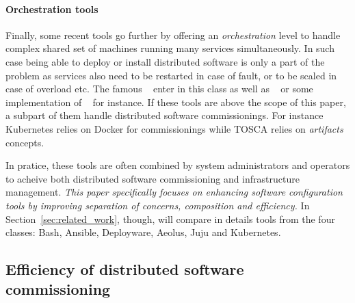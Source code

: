 \paragraph{Orchestration tools}
Finally, some recent tools go further by offering an
\emph{orchestration} level to handle complex shared set of machines
running many services simultaneously. In such case being able to
deploy or install distributed software is only a part of the problem
as services also need to be restarted in case of fault, or to be
scaled in case of overload etc. The famous \kubernetes~\cite{} enter in
this class as well as \dockerswarm~\cite{} or some implementation of
\tosca~\cite{} for instance. If these tools are above the scope of this
paper, a subpart of them handle distributed software
commissionings. For instance Kubernetes relies on Docker for
commissionings while TOSCA relies on \emph{artifacts} concepts.

In pratice, these tools are often combined by system administrators
and operators to acheive both distributed software commissioning and
infrastructure management. \emph{This paper specifically focuses on
enhancing \emph{software configuration tools} by improving separation
of concerns, composition and efficiency.} In
Section~\ref{sec:related_work}, though, will compare in details tools
from the four classes: Bash, Ansible, Deployware, Aeolus, Juju and
Kubernetes.

\subsection{Efficiency of distributed software commissioning}


